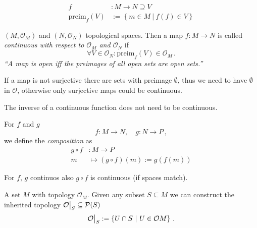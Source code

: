 \documentclass[11pt, a4paper, twocolumn]{article} %
\begin{document}
\begin{defn}[Preimage]
    \begin{align}
        f&: M \to N \supseteq V \nonumber \\
        \text{preim}_f(V) &:= \left\{ m\in M~|~f(f) \in V \right\}
    \end{align}
\end{defn}

\begin{defn}[Continuity]
    $(M, \mathcal{O}_M)$ and $(N, \mathcal{O}_N)$ topological spaces.
    Then a map $f: M \to N$ is called \textit{continuous with respect to $\mathcal{O}_M$ and
    $\mathcal{O}_N$} if
    \begin{equation}
    \forall V\in \mathcal{O}_N: \text{preim}_f(V) \in \mathcal{O}_M\,.
    \end{equation}
    \textit{``A map is open iff the preimages of all open sets are open sets.''}
\end{defn}

\begin{note}
    If a map is not surjective there are sets with preimage $\emptyset$, thus we need to have
    $\emptyset$ in $\mathcal{O}$, otherwise only surjective maps could be continuous.
\end{note}
\begin{note}
    The inverse of a continuous function does not need to be continuous.
\end{note}

\begin{defn}
    For $f$ and $g$
    \begin{equation*}
        f: M \to N, \quad g: N \to P\,,
    \end{equation*}
    we define the \textit{composition} as
    \begin{align}
        g \circ f&: M \to P \\
        m &\mapsto (g\circ f)(m) := g(f(m)) \nonumber
    \end{align}
\end{defn}

\begin{theorem}
    For $f$, $g$ continuos also $g\circ f$ is continuous (if spaces match).
\end{theorem}


\begin{defn}
    A set $M$ with topology $\mathcal{O}_M$. Given any subset $S \subseteq M$ we
    can construct the inherited topology $\mathcal{O}\big|_S \subseteq \mathcal{P}(S)$
    \begin{equation}
        \mathcal{O}\big|_S := \left\{ U\cap S~|~U\in \mathcal{O}M \right\}\,.
    \end{equation}
\end{defn}
\end{document}
